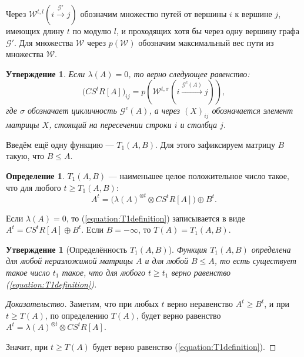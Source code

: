 \documentclass[12pt]{article}
\newtheorem{proposition}[theorem]{Утверждение}
\theoremstyle{definition}
\newtheorem{definition}[theorem]{Определение}
\begin{document}
Через $\mathcal{W}^{t, l}(i \xrightarrow{\mathcal{G}'} j)$ обозначим множество путей от вершины $i$ к вершине $j$, имеющих длину $t$ по модулю $l$, и проходящих хотя бы через одну вершину графа $\mathcal{G}'$. Для множества $\mathcal{W}$ через $p(\mathcal{W})$ обозначим максимальный вес пути из множества $\mathcal{W}$.

\begin{proposition} \cite[теорема 6.1]{15WeakCSRExpantion}
\label{entriesInCSR}
Если $\lambda(A) = 0$, то верно следующее равенство:
\begin{equation}
    \big(CS^tR[A]\big)_{ij} = p(\mathcal{W}^{t, \sigma}(i \xrightarrow{\mathcal{G}^c(A)} j)),
\end{equation}
где $\sigma$ обозначает цикличность $\mathcal{G}^c(A)$, а через $(X)_{ij}$ обозначается элемент матрицы $X$, стоящий на пересечении строки $i$ и столбца $j$.
\end{proposition}

Введём ещё одну функцию --- $T_1(A, B)$. Для этого зафиксируем матрицу $B$ такую, что $B \le A$.

\begin{definition} \cite[страница 165]{15WeakCSRExpantion}
\label{T1definition}
$T_1(A, B)$ --- наименьшее целое положительное число такое, что для любого $t \ge T_1(A, B)$:
\begin{equation}
\label{equation:T1definition}
    A^t = \big(\lambda(A)^{\otimes t} \otimes CS^tR[A] \big) \oplus B^t.
\end{equation}
\end{definition}

Если $\lambda(A) = 0$, то (\ref{equation:T1definition}) записывается в виде $A^t = CS^tR[A] \oplus B^t$. Если $B = -\infty$, то $T(A) = T_1(A, B)$.

\begin{proposition} [Определённость $T_1(A, B)$]
Функция $T_1(A, B)$ определена для любой неразложимой матрицы $A$ и для любой $B \le A$, то есть существует такое число $t_1$ такое, что для любого $t \ge t_1$ верно равенство (\ref{equation:T1definition}).
\end{proposition}
\begin{proof}[Доказательство]
Заметим, что при любых $t$ верно неравенство $A^t \ge B^t$, и при $t \ge T(A)$, по определению $T(A)$, будет верно равенство $A^t = \lambda(A)^{\otimes t} \otimes CS^tR[A]$.

Значит, при $t \ge T(A)$ будет верно равенство (\ref{equation:T1definition}).
\end{proof}
\end{document}
